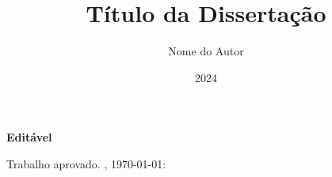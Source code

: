 \documentclass[12pt,a4paper,oneside]{abntex2}
\title{Título da Dissertação}
\author{Nome do Autor}
\date{2024}
\begin{document}

\imprimircapa

\imprimirfolhaderosto*


\begin{fichacatalografica}
    
\end{fichacatalografica}


\begin{folhadeaprovacao}

\end{folhadeaprovacao}

\begin{folhadeaprovacao}

  \begin{center}
    \textbf{Editável}
    
    {\ABNTEXchapterfont\large\imprimirautor}

    \vspace*{\fill}\vspace*{\fill}
    \begin{center}
      \ABNTEXchapterfont\bfseries\Large\imprimirtitulo
    \end{center}
    \vspace*{\fill}
    
    \hspace{.45\textwidth}
    \begin{minipage}{.5\textwidth}
        \imprimirpreambulo
    \end{minipage}%
    \vspace*{\fill}
   \end{center}
        
   Trabalho aprovado. \imprimirlocal, \today:

   
   \begin{center}
    \vspace*{0.5cm}
    {\large\imprimirlocal}
    \par
    {\large\imprimirdata}
    \vspace*{1cm}
  \end{center}
  
\end{folhadeaprovacao}
\end{document}
